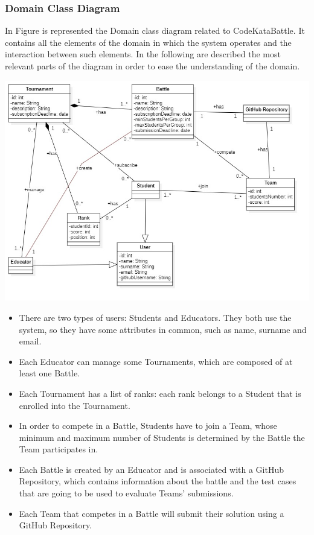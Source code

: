 \documentclass{article}
\begin{document}
\subsubsection{Domain Class Diagram}
In Figure is represented the Domain class diagram related to CodeKataBattle. It contains all the elements of the domain in which the system operates and the interaction between such elements. In the following are described the most relevant parts of the diagram in order to ease the understanding of the domain.
\begin{center}
    \includegraphics[width=1\linewidth]{DomainClass.jpg}
  \label{fig:domainclass}
\end{center}
\begin{itemize}
\item There are two types of users: Students and Educators. They both use the system, so they have some attributes in common, such as name, surname and email.
\item Each Educator can manage some Tournaments, which are composed of at least one Battle.
\item Each Tournament has a list of ranks: each rank belongs to a Student that is enrolled into the Tournament.
\item In order to compete in a Battle, Students have to join a Team, whose minimum and maximum number of Students is determined by the Battle the Team participates in.
\item Each Battle is created by an Educator and is associated with a GitHub Repository, which contains information about the battle and the test cases that are going to be used to evaluate Teams’ submissions.
\item Each Team that competes in a Battle will submit their solution using a GitHub Repository.
\end{itemize}
\end{document}
